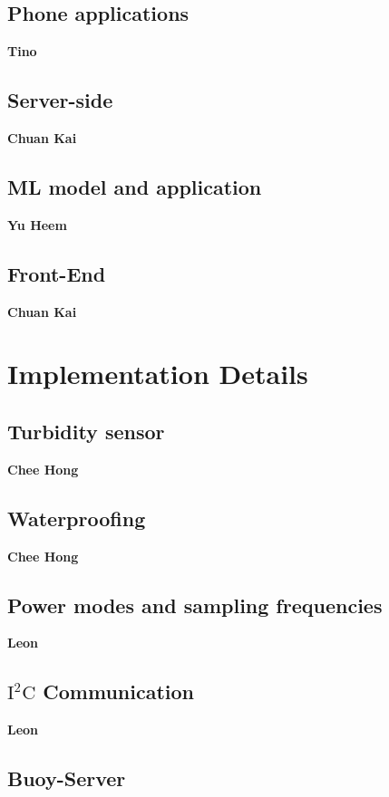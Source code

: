\documentclass{article}
\begin{document}
\subsection{Phone applications}

\textbf{Tino}

\subsection{Server-side}

\textbf{Chuan Kai}

\subsection{ML model and application}

\textbf{Yu Heem}

\subsection{Front-End}

\textbf{Chuan Kai}

\section{Implementation Details}

\subsection{Turbidity sensor}

\textbf{Chee Hong}

\subsection{Waterproofing}

\textbf{Chee Hong}

\subsection{Power modes and sampling frequencies}

\textbf{Leon}

\subsection{$\text{I}^2\text{C}$ Communication}

\textbf{Leon}

\subsection{Buoy-Server}
\end{document}
